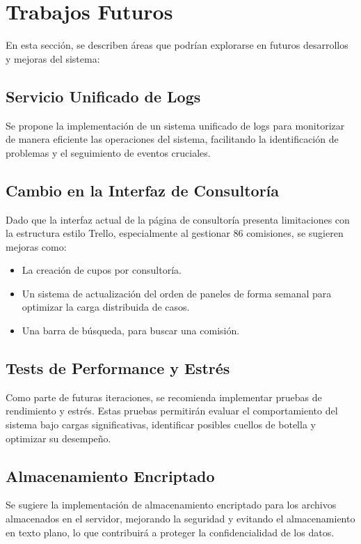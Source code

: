 \chapter{Trabajos Futuros}

En esta sección, se describen áreas que podrían explorarse en futuros desarrollos y mejoras del sistema:

\section{Servicio Unificado de Logs}

Se propone la implementación de un sistema unificado de logs para monitorizar de manera eficiente las operaciones del sistema, facilitando la identificación de problemas y el seguimiento de eventos cruciales.

\section{Cambio en la Interfaz de Consultoría}

Dado que la interfaz actual de la página de consultoría presenta limitaciones con la estructura estilo Trello, especialmente al gestionar 86 comisiones, se sugieren mejoras como:

\begin{itemize}
\item La creación de cupos por consultoría.
\item Un sistema de actualización del orden de paneles de forma semanal para optimizar la carga distribuida de casos.
\item  Una barra de búsqueda, para buscar una comisión.
\end{itemize}

\section{Tests de Performance y Estrés}

Como parte de futuras iteraciones, se recomienda implementar pruebas de rendimiento y estrés. Estas pruebas permitirán evaluar el comportamiento del sistema bajo cargas significativas, identificar posibles cuellos de botella y optimizar su desempeño.

\section{Almacenamiento Encriptado}

Se sugiere la implementación de almacenamiento encriptado para los archivos almacenados en el servidor, mejorando la seguridad y evitando el almacenamiento en texto plano, lo que contribuirá a proteger la confidencialidad de los datos.


